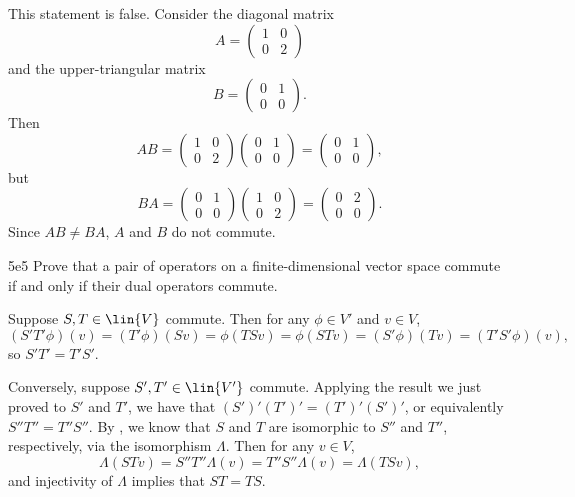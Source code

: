 \begin{sol}
    This statement is false.
    Consider the diagonal matrix
    \[
        A = \begin{pmatrix}
            1 & 0 \\
            0 & 2
        \end{pmatrix}
    \]
    and the upper-triangular matrix
    \[
        B = \begin{pmatrix}
            0 & 1 \\
            0 & 0
        \end{pmatrix}.
    \]
    Then
    \[
        AB =
        \begin{pmatrix}
            1 & 0 \\
            0 & 2
        \end{pmatrix}
        \begin{pmatrix}
            0 & 1 \\
            0 & 0
        \end{pmatrix} = 
        \begin{pmatrix}
            0 & 1 \\
            0 & 0
        \end{pmatrix},
    \]
    but
    \[
        BA = 
        \begin{pmatrix}
            0 & 1 \\
            0 & 0
        \end{pmatrix}
        \begin{pmatrix}
            1 & 0 \\
            0 & 2
        \end{pmatrix} =
        \begin{pmatrix}
            0 & 2 \\
            0 & 0
        \end{pmatrix}.
    \]
    Since $AB \neq BA$, $A$ and $B$ do not commute.
\end{sol}

\begin{exercise}{5e5}
    Prove that a pair of operators on a finite-dimensional vector space commute if and only if their dual operators commute.

\end{exercise}

\begin{sol}
    Suppose $S, T \in \lin{V}$ commute.
    Then for any $\phi \in V'$ and $v \in V$,
    \[
        (S'T'\phi)(v) = (T'\phi)(Sv) = \phi(TSv) = \phi(STv) = (S'\phi)(Tv) = (T'S'\phi)(v),
    \]
    so $S'T' = T'S'$.
    
    Conversely, suppose $S', T' \in \lin{V'}$ commute.
    Applying the result we just proved to $S'$ and $T'$, we have that $(S')'(T')' = (T')'(S')'$, or equivalently $S''T'' = T''S''$.
    By , we know that $S$ and $T$ are isomorphic to $S''$ and $T''$, respectively, via the isomorphism $\Lambda$.
    Then for any $v \in V$,
    \[
        \Lambda(S Tv) = S''T''\Lambda(v) = T''S''\Lambda(v) = \Lambda(T Sv),
    \]
    and injectivity of $\Lambda$ implies that $ST = TS$.
\end{sol}

